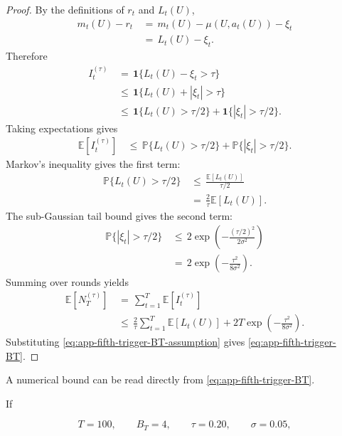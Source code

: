 \documentclass{article} %
\begin{document}
\begin{proof}
By the definitions of \(r_t\) and \(L_t(U)\),
\begin{align}
\label{eq:app-fifth-trigger-proof-gap}
m_t(U)-r_t
&\,=\,
m_t(U)-\mu(U,a_t(U))-\xi_t
\\
&\,=\,
L_t(U)-\xi_t.
\end{align}
Therefore
\begin{align}
\label{eq:app-fifth-trigger-proof-indicator}
I_t^{(\tau)}
&\,=\,
\mathbf{1}\{L_t(U)-\xi_t>\tau\}
\\
&\,\le\,
\mathbf{1}\{L_t(U)+|\xi_t|>\tau\}
\\
&\,\le\,
\mathbf{1}\{L_t(U)>\tau/2\}
+
\mathbf{1}\{|\xi_t|>\tau/2\}.
\end{align}
Taking expectations gives
\begin{align}
\label{eq:app-fifth-trigger-proof-expect}
\mathbb{E}[I_t^{(\tau)}]
&\,\le\,
\mathbb{P}\{L_t(U)>\tau/2\}
+
\mathbb{P}\{|\xi_t|>\tau/2\}.
\end{align}
Markov's inequality gives the first term:
\begin{align}
\label{eq:app-fifth-trigger-proof-markov}
\mathbb{P}\{L_t(U)>\tau/2\}
&\,\le\,
\frac{\mathbb{E}[L_t(U)]}{\tau/2}
\\
&\,=\,
\frac{2}{\tau}\mathbb{E}[L_t(U)].
\end{align}
The sub-Gaussian tail bound gives the second term:
\begin{align}
\label{eq:app-fifth-trigger-proof-tail}
\mathbb{P}\{|\xi_t|>\tau/2\}
&\,\le\,
2\exp\!\left(
-\frac{(\tau/2)^2}{2\sigma^2}
\right)
\\
&\,=\,
2\exp\!\left(
-\frac{\tau^2}{8\sigma^2}
\right).
\end{align}
Summing over rounds yields
\begin{align}
\label{eq:app-fifth-trigger-proof-sum}
\mathbb{E}[N_T^{(\tau)}]
&\,=\,
\sum_{t=1}^{T}\mathbb{E}[I_t^{(\tau)}]
\\
&\,\le\,
\frac{2}{\tau}
\sum_{t=1}^{T}\mathbb{E}[L_t(U)]
+
2T\exp\!\left(
-\frac{\tau^2}{8\sigma^2}
\right).
\end{align}
Substituting \eqref{eq:app-fifth-trigger-BT-assumption} gives \eqref{eq:app-fifth-trigger-BT}.
\end{proof}

A numerical bound can be read directly from \eqref{eq:app-fifth-trigger-BT}.

If

\begin{equation}
\label{eq:app-fifth-trigger-example-params}
T=100,
\qquad
B_T=4,
\qquad
\tau=0.20,
\qquad
\sigma=0.05,
\end{equation}
\end{document}
